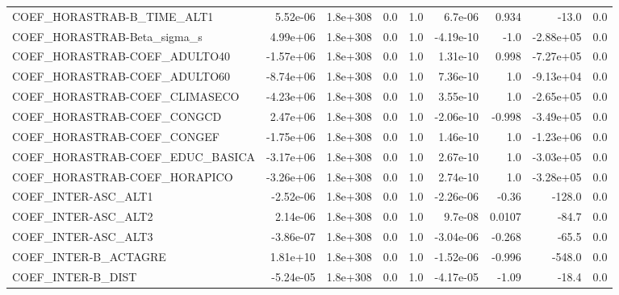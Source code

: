 \begin{tabular}{lrrrrrrrr}
COEF\_HORASTRAB-B\_TIME\_ALT1        &    5.52e-06 &     1.8e+308 &     0.0 &      1.0 &    6.7e-06 &       0.934 &        -13.0 &           0.0 \\
COEF\_HORASTRAB-Beta\_sigma\_s       &    4.99e+06 &     1.8e+308 &     0.0 &      1.0 &  -4.19e-10 &        -1.0 &    -2.88e+05 &           0.0 \\
COEF\_HORASTRAB-COEF\_ADULTO40      &   -1.57e+06 &     1.8e+308 &     0.0 &      1.0 &   1.31e-10 &       0.998 &    -7.27e+05 &           0.0 \\
COEF\_HORASTRAB-COEF\_ADULTO60      &   -8.74e+06 &     1.8e+308 &     0.0 &      1.0 &   7.36e-10 &         1.0 &    -9.13e+04 &           0.0 \\
COEF\_HORASTRAB-COEF\_CLIMASECO     &   -4.23e+06 &     1.8e+308 &     0.0 &      1.0 &   3.55e-10 &         1.0 &    -2.65e+05 &           0.0 \\
COEF\_HORASTRAB-COEF\_CONGCD        &    2.47e+06 &     1.8e+308 &     0.0 &      1.0 &  -2.06e-10 &      -0.998 &    -3.49e+05 &           0.0 \\
COEF\_HORASTRAB-COEF\_CONGEF        &   -1.75e+06 &     1.8e+308 &     0.0 &      1.0 &   1.46e-10 &         1.0 &    -1.23e+06 &           0.0 \\
COEF\_HORASTRAB-COEF\_EDUC\_BASICA   &   -3.17e+06 &     1.8e+308 &     0.0 &      1.0 &   2.67e-10 &         1.0 &    -3.03e+05 &           0.0 \\
COEF\_HORASTRAB-COEF\_HORAPICO      &   -3.26e+06 &     1.8e+308 &     0.0 &      1.0 &   2.74e-10 &         1.0 &    -3.28e+05 &           0.0 \\
COEF\_INTER-ASC\_ALT1               &   -2.52e-06 &     1.8e+308 &     0.0 &      1.0 &  -2.26e-06 &       -0.36 &       -128.0 &           0.0 \\
COEF\_INTER-ASC\_ALT2               &    2.14e-06 &     1.8e+308 &     0.0 &      1.0 &    9.7e-08 &      0.0107 &        -84.7 &           0.0 \\
COEF\_INTER-ASC\_ALT3               &   -3.86e-07 &     1.8e+308 &     0.0 &      1.0 &  -3.04e-06 &      -0.268 &        -65.5 &           0.0 \\
COEF\_INTER-B\_ACTAGRE              &    1.81e+10 &     1.8e+308 &     0.0 &      1.0 &  -1.52e-06 &      -0.996 &       -548.0 &           0.0 \\
COEF\_INTER-B\_DIST                 &   -5.24e-05 &     1.8e+308 &     0.0 &      1.0 &  -4.17e-05 &       -1.09 &        -18.4 &           0.0 \\

\end{tabular}
